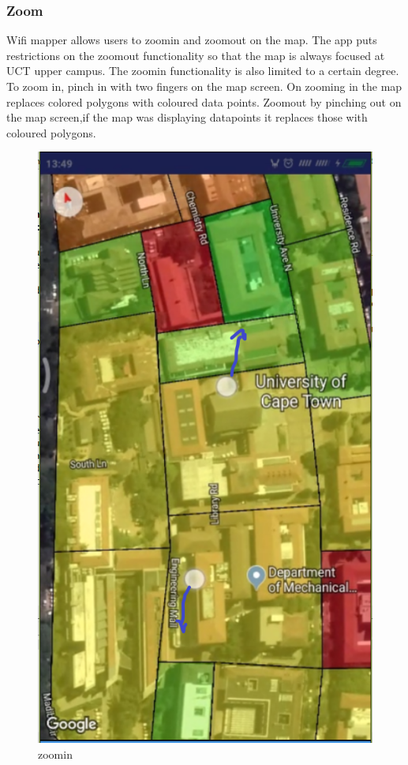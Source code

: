 \subsubsection {Zoom}
Wifi mapper allows users to zoomin and zoomout on the map. The app puts restrictions on the zoomout functionality so that the map is always focused at UCT upper campus. The zoomin functionality is also limited to a certain degree. To zoom in, pinch in with two fingers on the map screen. On zooming in the map replaces colored polygons with coloured data points. Zoomout by pinching out on the map screen,if the map was displaying datapoints it replaces those with coloured polygons.
\begin{figure}
	\centering
	\includegraphics[width=0.7\linewidth]{images_manual/zoomin}
	\caption{zoomin}
	\label{fig:zoomin}
\end{figure}

